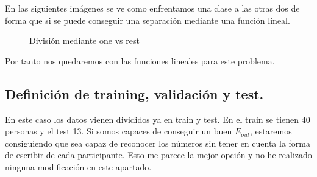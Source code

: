 \documentclass[titlepage]{article}
\begin{document}
En las siguientes imágenes se ve como enfrentamos una clase a las otras dos de forma que si se puede conseguir una separación mediante una función lineal.



\begin{figure}[H]
	\centering
	\caption{División mediante one vs rest}
\end{figure}

Por tanto nos quedaremos con las funciones lineales para este problema.
 
\subsection{Definición de training, validación y test.}
En este caso los datos vienen divididos ya en train y test. En el train se tienen 40 personas y el test 13. Si somos capaces de conseguir un buen $E_{out}$, estaremos consiguiendo que sea capaz de reconocer los números sin tener en cuenta la forma de escribir de cada participante. Esto me parece la mejor opción y no he realizado ninguna modificación en este apartado.
\end{document}
